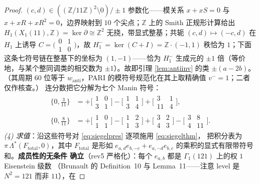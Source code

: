 \documentclass[11pt,a4paper]{ctexart}
\theoremstyle{remark}
\newcommand{\ZZ}{\mathbb{Z}}
\begin{document}
\begin{proof}
$(c,d)\in((\ZZ/11\ZZ)^2\setminus0)/\pm1$ 参数化——模关系 $x+xS=0$ 与
$x+xR+xR^2=0$，边界映射到 $10$ 个尖点；$\ZZ$ 上的 Smith 正规形计算给出
$H_1(X_1(11),\ZZ)=\ker\partial\cong\ZZ^2$ 无挠，带显式整基；共轭
$(c,d)\mapsto(-c,d)$ 在 $H_1$ 上诱导
$C=\bigl(\begin{smallmatrix}0&1\\1&0\end{smallmatrix}\bigr)$，故
$H_1^-=\ker(C+I)=\ZZ\cdot(-1,1)$ 秩恰为 $1$；下面这条七符号链在整基下的坐标为
$(1,-1)$——恰为 $H_1^-$ 生成元的 $\pm1$ 倍（等价地，与某个整同调类的相交数为
$\pm1$）。故即引理 \ref{lem:antiinv} 的类 $\pm(a-2b)$。（其周期 $60$ 位等于
$w_{\mathrm{anti}}$，PARI 的模符号规范化在其上取精确值 $v^-=1$；二者仅作核查。）
连分数把它分解为七个 Manin 符号：
\[
\begin{aligned}
\{0,\tfrac{3}{11}\}&=\textstyle
 +\bigl[\begin{smallmatrix}1&0\\3&1\end{smallmatrix}\bigr]
 -\bigl[\begin{smallmatrix}1&1\\3&4\end{smallmatrix}\bigr]
 +\bigl[\begin{smallmatrix}3&1\\11&4\end{smallmatrix}\bigr],\\
\{0,\tfrac{8}{11}\}&=\textstyle
 +\bigl[\begin{smallmatrix}1&0\\1&1\end{smallmatrix}\bigr]
 -\bigl[\begin{smallmatrix}1&2\\1&3\end{smallmatrix}\bigr]
 +\bigl[\begin{smallmatrix}3&2\\4&3\end{smallmatrix}\bigr]
 -\bigl[\begin{smallmatrix}3&8\\4&11\end{smallmatrix}\bigr].
\end{aligned}
\]
\emph{(4) 求值}：沿这些符号对 \eqref{eq:siegelpres} 逐项施用 \eqref{eq:siegelthm}，
把积分表为 $\pi\,\Lambda^*(F_{\mathrm{total}},0)$，其中 $F_{\mathrm{total}}$ 是形如
$e_{a,d}e_{b,-c}+e_{a,-d}e_{b,c}$ 的乘积的显式有限带符号和。\textbf{成员性的无条件
确立}（rev5 严格化）：每个 $e_{a,b}$ 都是 $\Gamma_1(121)$ 上的权 $1$ Eisenstein 级数
（Brunault 的 Definition~10 与 Lemma~11——注意 level 是 $N^2=121$ 而非 $11$），在

\end{proof}
\end{document}
